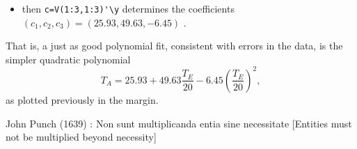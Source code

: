 \begin{example}
\begin{solution}
\begin{enumerate}
\begin{itemize}
\item then \verb|c=V(1:3,1:3)'\y| determines the coefficients \((c_1,c_2,c_3)=(25.93,49.63,-6.45)\) \twodp.
\end{itemize}
That is, a just as good polynomial fit, consistent with errors in the data, is the simpler quadratic polynomial
\begin{equation*}
T_A=25.93+49.63\frac{T_E}{20} 
-6.45\left(\frac{T_E}{20}\right)^2,
\end{equation*}
as plotted previously in the margin.
\end{enumerate}
\end{solution}
\end{example}



\begin{quoted}{John Punch (1639)}
: Non sunt multiplicanda entia sine necessitate
[Entities must not be multiplied beyond necessity]
\end{quoted}







